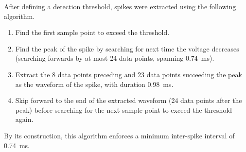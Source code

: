 After defining a detection threshold, spikes were extracted using the following algorithm.
\begin{enumerate}
\item Find the first sample point to exceed the threshold.
\item Find the peak of the spike by searching for next time the voltage decreases (searching forwards by at most \num{24} data points, spanning \SI{0.74}{\milli\second}).
\item Extract the \num{8} data points preceding and \num{23} data points succeeding the peak as the waveform of the spike, with duration \SI{0.98}{\milli\second}.
\item Skip forward to the end of the extracted waveform (\num{24} data points after the peak) before searching for the next sample point to exceed the threshold again.
\end{enumerate}
By its construction, this algorithm enforces a minimum inter-spike interval of \SI{0.74}{\milli\second}.

